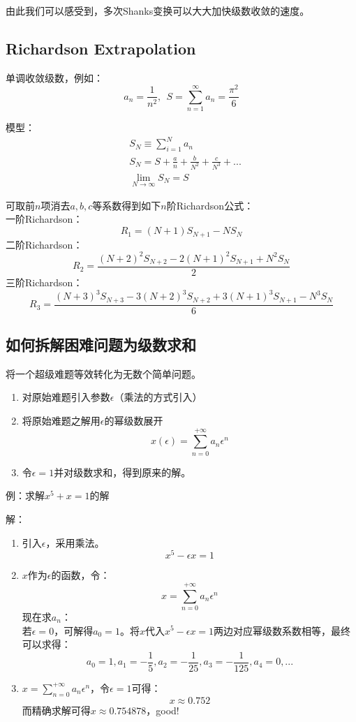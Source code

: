 由此我们可以感受到，多次Shanks变换可以大大加快级数收敛的速度。

\subsection{Richardson Extrapolation}
\label{re}

单调收敛级数，例如：
\[a_n=\frac{1}{n^2},\ \ S=\sum_{n=1}^{\infty}a_n=\frac{\pi^2}{6}\]

模型：
\begin{align}
&S_N \equiv \sum_{i=1}^{N}a_n\\
&S_N = S+\frac{a}{n}+\frac{b}{N^2}+\frac{c}{N^3}+...\\
&\lim\limits_{N \rightarrow \infty}S_N = S
\end{align}

可取前$n$项消去$a,b,c$等系数得到如下$n$阶Richardson公式：\\
一阶Richardson：
\begin{equation}
R_1 = (N+1) S_{N+1} - N S_N
\end{equation}
二阶Richardson：
\begin{equation}
R_2 = \frac{(N+2)^2 S_{N+2} - 2(N+1)^2 S_{N+1} + N^2 S_N}{2}
\end{equation}
三阶Richardson：
\begin{equation}
R_3 = \frac{(N+3)^3 S_{N+3} - 3(N+2)^3 S_{N+2} + 3(N+1)^3 S_{N+1} - N^3 S_N}{6}
\end{equation}

\subsection{如何拆解困难问题为级数求和}


将一个超级难题等效转化为无数个简单问题。

\begin{enumerate}[fullwidth,itemindent=2em]
	\item
		对原始难题引入参数$\epsilon$（乘法的方式引入）
	\item
		将原始难题之解用$\epsilon$的幂级数展开
		\[x(\epsilon)=\sum_{n=0}^{+\infty}a_n \epsilon ^n\]
	\item
		令$\epsilon = 1$并对级数求和，得到原来的解。
\end{enumerate}

例：求解$x^5+x=1$的解

解：
\begin{enumerate}[fullwidth,itemindent=2em,label=(\arabic*)]
	\item
		引入$\epsilon$，采用乘法。
		\[x^5-\epsilon x = 1\]
	\item
		$x$作为$\epsilon$的函数，令：
		\[x=\sum_{n=0}^{+\infty}a_n \epsilon ^n\]
		现在求$a_n$：\\
		若$\epsilon=0$，可解得$a_0=1$。将$x$代入$x^5-\epsilon x = 1$两边对应幂级数系数相等，最终可以求得：
		\[a_0=1,a_1=-\frac{1}{5},a_2=-\frac{1}{25},a_3=-\frac{1}{125},a_4=0,...\]
	\item
		$x=\sum_{n=0}^{+\infty}a_n \epsilon ^n$，令$\epsilon=1$可得：
		\[x \approx 0.752\]
		而精确求解可得$x\approx0.754878$，good!
\end{enumerate}

